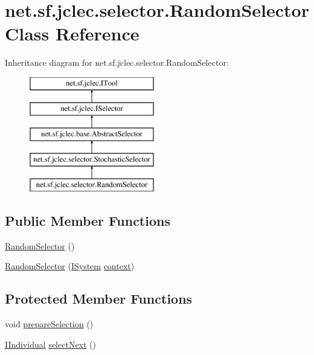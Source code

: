 \hypertarget{classnet_1_1sf_1_1jclec_1_1selector_1_1_random_selector}{\section{net.\-sf.\-jclec.\-selector.\-Random\-Selector Class Reference}
\label{classnet_1_1sf_1_1jclec_1_1selector_1_1_random_selector}
}
Inheritance diagram for net.\-sf.\-jclec.\-selector.\-Random\-Selector\-:\begin{figure}[H]
\begin{center}
\leavevmode
\includegraphics[height=5.000000cm]{classnet_1_1sf_1_1jclec_1_1selector_1_1_random_selector}
\end{center}
\end{figure}
\subsection*{Public Member Functions}
\begin{DoxyCompactItemize}
\item 
\hyperlink{classnet_1_1sf_1_1jclec_1_1selector_1_1_random_selector_a1c268a758717610d01e17d8287f8ebc0}{Random\-Selector} ()
\item 
\hyperlink{classnet_1_1sf_1_1jclec_1_1selector_1_1_random_selector_a1ccf39a3ed33a63ebaaefc905a4aa767}{Random\-Selector} (\hyperlink{interfacenet_1_1sf_1_1jclec_1_1_i_system}{I\-System} \hyperlink{classnet_1_1sf_1_1jclec_1_1base_1_1_abstract_selector_a4304fe5c27aa7631dc91678d22473b94}{context})
\end{DoxyCompactItemize}
\subsection*{Protected Member Functions}
\begin{DoxyCompactItemize}
\item 
void \hyperlink{classnet_1_1sf_1_1jclec_1_1selector_1_1_random_selector_a560e1811c364ea7fabf92ced37f6e9ef}{prepare\-Selection} ()
\item 
\hyperlink{interfacenet_1_1sf_1_1jclec_1_1_i_individual}{I\-Individual} \hyperlink{classnet_1_1sf_1_1jclec_1_1selector_1_1_random_selector_a0771964cb15ffb2de63ec98292bddcdd}{select\-Next} ()
\end{DoxyCompactItemize}
